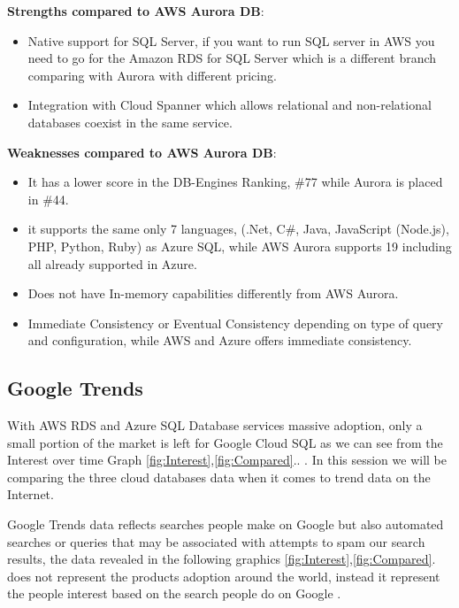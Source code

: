 \documentclass{article}
\begin{document}
\textbf{Strengths compared to AWS Aurora DB}:
\begin{itemize}
    \item Native support for SQL Server, if you want to run SQL server in AWS you need to go for the Amazon RDS for SQL Server which is a different branch comparing with Aurora with different pricing. 
    \item Integration with Cloud Spanner which allows relational and non-relational databases coexist in the same service.
\end{itemize}

\textbf{Weaknesses compared to AWS Aurora DB}:

\begin{itemize}
    \item It has a lower score in the DB-Engines Ranking, \#77 while Aurora is placed in \#44.\cite{dbengineers2021} 
    \item it supports the same only 7 languages, (.Net, C\#, Java, JavaScript (Node.js), PHP, Python, Ruby) as Azure SQL, while AWS Aurora supports 19 including all already supported in Azure. 
    \item Does not have In-memory capabilities differently from AWS Aurora. \cite{dbengineers2021}
    \item Immediate Consistency or Eventual Consistency depending on type of query and configuration, while AWS and Azure offers immediate consistency. 
\end{itemize}

\subsection{Google Trends}

With AWS RDS and Azure SQL Database services massive adoption, \cite{GoogleTrends} only a small portion of the market is left for Google Cloud SQL as we can see from the Interest over time Graph \ref{fig:Interest},\ref{fig:Compared}.. \cite{GoogleTrends}. In this session we will be comparing the three cloud databases data when it comes to trend data on the Internet. 

Google Trends data reflects searches people make on Google but also automated searches or queries that may be associated with attempts to spam our search results, the data revealed in the following graphics \ref{fig:Interest},\ref{fig:Compared}. \cite{GoogleTrends} does not represent the products adoption around the world, instead it represent the people interest based on the search people do on Google \cite{GoogleTrends}. 
\end{document}
